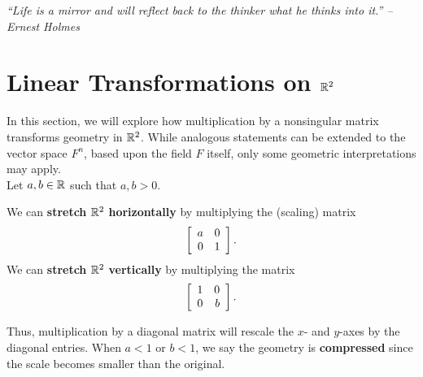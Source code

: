 \begin{center} 
\emph{``Life is a mirror and will reflect back to the thinker what he thinks into it.'' --  Ernest Holmes}
\end{center}

\section{Linear Transformations on $\R^2$}\label{sec:trans2}
In this section, we will explore how multiplication by a nonsingular matrix transforms geometry in $\R^2$. While analogous statements can be extended to the vector space $F^n$, based upon the field $F$ itself, only some geometric interpretations may apply.\\

Let $a, b\in \R$ such that $a,b > 0$. \vspace{-0.1 in}
\begin{multicols}{2}
\noindent We can \textbf{stretch} $\R^2$ \textbf{horizontally} by multiplying the (scaling) matrix 
\[\mtx{rr}{a&0\\0&1}.\] 
\noindent We can \textbf{stretch} $\R^2$ \textbf{vertically} by multiplying the matrix 
\[\mtx{rr}{1&0\\0&b}.\]
\end{multicols} \vspace{-0.1 in}
\noindent Thus, multiplication by a diagonal matrix will rescale the $x$- and $y$-axes by the diagonal entries. When $a < 1$ or $b < 1$, we say the geometry is \textbf{compressed} since the scale becomes smaller than the original.\\


